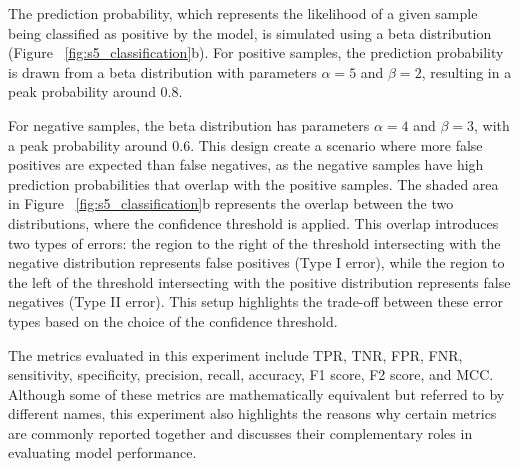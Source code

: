The prediction probability, which represents the likelihood of a given sample being classified as positive by the model, is simulated using a beta distribution (Figure ~\ref{fig:s5_classification}b). For positive samples, the prediction probability is drawn from a beta distribution with parameters $\alpha = 5$ and $\beta = 2$, resulting in a peak probability around 0.8. 

For negative samples, the beta distribution has parameters $\alpha = 4$ and $\beta = 3$, with a peak probability around 0.6. This design create a scenario where more false positives are expected than false negatives, as the negative samples have high prediction probabilities that overlap with the positive samples. The shaded area in Figure ~\ref{fig:s5_classification}b represents the overlap between the two distributions, where the confidence threshold is applied. This overlap introduces two types of errors: the region to the right of the threshold intersecting with the negative distribution represents false positives (Type I error), while the region to the left of the threshold intersecting with the positive distribution represents false negatives (Type II error). This setup highlights the trade-off between these error types based on the choice of the confidence threshold.

The metrics evaluated in this experiment include TPR, TNR, FPR, FNR, sensitivity, specificity, precision, recall, accuracy, F1 score, F2 score, and MCC. Although some of these metrics are mathematically equivalent but referred to by different names, this experiment also highlights the reasons why certain metrics are commonly reported together and discusses their complementary roles in evaluating model performance.
